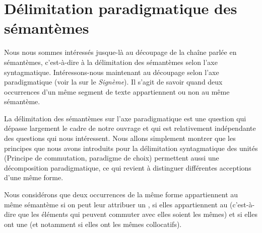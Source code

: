 \section{Délimitation paradigmatique des sémantèmes}\label{sec:2.3.13}

Nous nous sommes intéressés jusque-là au découpage de la chaîne parlée en sémantèmes, c’est-à-dire à la délimitation des sémantèmes selon l’axe syntagmatique. Intéressons-nous maintenant au découpage selon l’axe paradigmatique (voir la  sur le \textit{Signème}). Il s’agit de savoir quand deux occurrences d’un même segment de texte appartiennent ou non au même sémantème.

La délimitation des sémantèmes sur l’axe paradigmatique est une question qui dépasse largement le cadre de notre ouvrage et qui est relativement indépendante des questions qui nous intéressent. Nous allons simplement montrer que les principes que nous avons introduits pour la délimitation syntagmatique des unités (Principe de commutation, paradigme de choix) permettent aussi une décomposition paradigmatique, ce qui revient à distinguer différentes acceptions d’une même forme.

Nous considérons que deux occurrences de la même forme appartiennent au même sémantème si on peut leur attribuer un , si elles appartiennent au  (c’est-à-dire que les éléments qui peuvent commuter avec elles soient les mêmes) et si elles ont une  (et notamment si elles ont les mêmes collocatifs).

